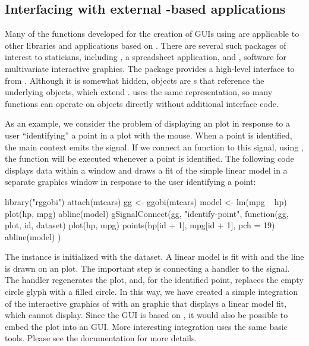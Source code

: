 \documentclass[article,shortnames]{jss}
\begin{document}
\subsection[Interfacing with external GObject-based
applications]{Interfacing with external -based
applications}

Many of the  functions developed for the creation of GUIs
using  are applicable to other libraries and applications
based on . There are several such packages of interest to
staticians, including , a spreadsheet application, and
, software for multivariate interactive graphics. The
 package \citep{rggobi} provides a high-level interface to
 from . Although it is somewhat hidden,
 objects are s that reference the
underlying  objects, which extend
.  uses the same  representation,
so many  functions can operate on  objects
directly without additional interface code.

As an example, we consider the problem of displaying an 
plot in response to a user ``identifying'' a point in a 
plot with the mouse. When a  point is identified, the main
 context emits the  signal. If we
connect an  function to this signal, using
, the function will be executed whenever a point
is identified. 
The following code displays data within a  window and
draws a fit of the simple linear model in a separate 
graphics window in response to the user identifying a point:
\begin{Code}
library("rggobi")
attach(mtcars)
gg <- ggobi(mtcars)
model <- lm(mpg ~ hp)
plot(hp, mpg)
abline(model)
gSignalConnect(gg, "identify-point", 
               function(gg, plot, id, dataset) {
                plot(hp, mpg)
                points(hp[id + 1], mpg[id + 1], pch = 19)
                abline(model)
               })
\end{Code}
The  instance is initialized with the 
dataset.  A linear model is fit with  and the line is drawn
on an  plot. The important step is connecting a handler to
the  signal. The handler regenerates the
 plot, and, for the identified point, replaces the empty
circle glyph with a filled circle.  In this way, we have created a
simple integration of the interactive
graphics of  with an  graphic that displays a
linear model fit, which  cannot display. Since the
 GUI is based on , it would also be possible to
embed the  plot into an  GUI. More interesting
integration uses the same basic tools. Please see the 
documentation for more details.
\end{document}
